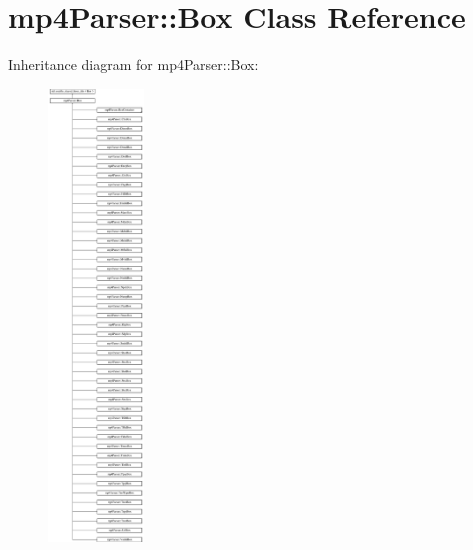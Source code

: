 \hypertarget{classmp4_parser_1_1_box}{}\section{mp4\+Parser\+::Box Class Reference}
\label{classmp4_parser_1_1_box}
Inheritance diagram for mp4\+Parser\+::Box\+:\begin{figure}[H]
\begin{center}
\leavevmode
\includegraphics[height=12.000000cm]{classmp4_parser_1_1_box}
\end{center}
\end{figure}
